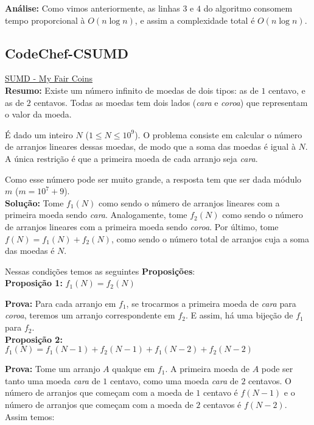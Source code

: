 \textbf{Análise:}
Como vimos anteriormente, as linhas $3$ e $4$ do algoritmo consomem tempo proporcional à $O(n \log n)$, e assim a complexidade total é $O(n \log n)$.




\subsection{CodeChef-CSUMD}
\href{https://www.codechef.com/JULY12/problems/CSUMD}{SUMD - My Fair Coins}\\


\textbf{Resumo:}
Existe um número infinito de moedas de dois tipos: as de $1$ centavo, e as de $2$ centavos. 
Todas as moedas tem dois lados (\textit{cara} e \textit{coroa}) que representam o valor da moeda. 

É dado um inteiro $N$ ($1 \leq N \leq 10^9$). 
O problema consiste em calcular o número de arranjos lineares dessas moedas, de modo que a soma das moedas é igual à $N$.
A única restrição é que a primeira moeda de cada arranjo seja \textit{cara}. 

Como esse número pode ser muito grande, a resposta tem que ser dada módulo $m$ ($m = 10^7+9$).
\\

\textbf{Solução:}
Tome $f_1(N)$ como sendo o número de arranjos lineares com a primeira moeda sendo \textit{cara}. Analogamente, tome $f_2(N)$
como sendo o número de arranjos lineares com a primeira moeda sendo \textit{coroa}. Por último, tome $f(N) = f_1(N)+f_2(N)$, como
sendo o número total de arranjos cuja a soma das moedas é $N$.

Nessas condições temos as seguintes \textbf{Proposições}:
\\

\textbf{Proposição 1:} $f_1(N) = f_2(N)$

\textbf{Prova:} Para cada arranjo em $f_1$, se trocarmos a primeira moeda de \textit{cara} para \textit{coroa}, teremos um arranjo correspondente em $f_2$. E assim, há uma bijeção de $f_1$ para $f_2$.
\\

\textbf{Proposição 2:} $f_1(N) = f_1(N-1) + f_2(N-1) + f_1(N-2) + f_2(N-2)$

\textbf{Prova: }Tome um arranjo $A$ qualque em $f_1$. A primeira moeda de $A$ pode ser tanto uma moeda \textit{cara} de $1$ centavo,
como uma moeda \textit{cara} de $2$ centavos. O número de arranjos que começam com a moeda de $1$ centavo é $f(N-1)$ e o número de arranjos que começam com a moeda de $2$ centavos é $f(N-2)$. Assim temos:

